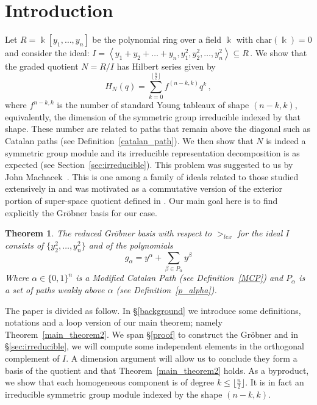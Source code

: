 \documentclass[12pt,reqno]{amsart}
\theoremstyle{plain}
\newtheorem{theorem}{Theorem}[section]
\theoremstyle{definition}
\DeclareMathOperator{\la}{\langle}
\DeclareMathOperator{\ra}{\rangle}
\def\field{\Bbbk}
\begin{document}
\section{Introduction} 
Let $R = \field[y_1, \dots, y_n]$ be the polynomial ring over a field $\field$ with $\text{char}( \field) = 0$ and consider the ideal:
$    I = \la y_1 + y_2 + \dots + y_n, y^2_1, y^2_2, \dots , y^2_n \ra \subseteq R\,.$
We show that the graded quotient $N = R /I$ has Hilbert series given by 
$$H_N(q)=\sum_{k=0}^{\lfloor \frac{n}{2} \rfloor } f^{(n-k,k)}q^k\,,$$
 where $f^{n-k,k}$ is the number of standard Young tableaux of shape $(n-k,k)$, equivalently, the dimension of the symmetric group irreducible indexed by that shape. 
 These number are related to paths that remain above the diagonal such as Catalan paths (see Definition~\ref{catalan_path}).
 We then show that $N$ is indeed a symmetric group module and
its irreducible representation decomposition is as expected (see Section~\ref{sec:irreducible}). This problem was suggested to us by John Machacek~\cite{M}.
This is one among a family of ideals related to those studied extensively in \cite{HRS} and was motivated as a commutative version of the exterior portion of super-space quotient defined in \cite{Z}. Our main goal here is to find explicitly the Gr\"obner basis for our case. 
\begin{theorem} \label{main_theorem}
	 The reduced Gr\"obner basis with respect to $>_{lex}$ for the ideal $I$ consists of $\{y_2^2, \dots, y_n^2\}$ and of the polynomials
	\begin{equation} \label{main_theorem_eqn}
		g_{\alpha} = y^{\alpha} + \sum_{\beta \in P_{\alpha}} y^{\beta}
	\end{equation}
	Where $\alpha \in \{0,1\}^n$ is a Modified Catalan Path (see Definition~\ref{MCP}) and $P_\alpha$ is a set of paths weakly above $\alpha$ (see Definition~\ref{p_alpha}). \end{theorem}
The   paper is divided as follow. In \S\ref{background}  we introduce some definitions, notations and a loop version of our main theorem; namely Theorem~\ref{main_theorem2}. 
We span \S\ref{proof} to construct the Gr\"obner and in \S\ref{sec:irreducible}, we will compute some independent elements in the orthogonal complement of $I$. A dimension argument will allow us to conclude they form a basis of the quotient and that Theorem~\ref{main_theorem2} holds. As a byproduct, we show that each homogeneous component is of degree $k\le {\lfloor \frac{n}{2} \rfloor }$. It is in fact  an irreducible  symmetric group module indexed by the shape $(n-k,k)$.
\end{document}
